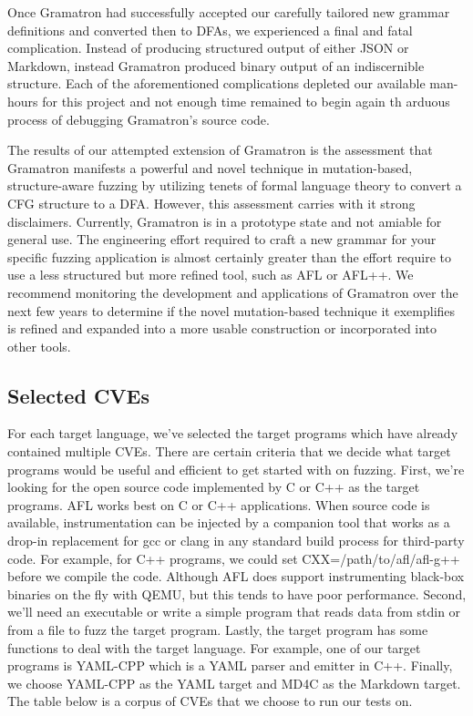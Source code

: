 \documentclass[12pt]{diazessay}
\begin{document}
Once Gramatron had successfully accepted our carefully tailored new grammar definitions and converted then to DFAs, we experienced a final and fatal complication.
Instead of producing structured output of either JSON or Markdown, instead Gramatron produced binary output of an indiscernible structure.
Each of the aforementioned complications depleted our available man-hours for this project and not enough time remained to begin again th arduous process of debugging Gramatron's source code.

The results of our attempted extension of Gramatron is the assessment that Gramatron manifests a powerful and novel technique in mutation-based, structure-aware fuzzing by utilizing tenets of formal language theory to convert a CFG structure to a DFA.
However, this assessment carries with it strong disclaimers.
Currently, Gramatron is in a prototype state and not amiable for general use. 
The engineering effort required to craft a new grammar for your specific fuzzing application is almost certainly greater than the effort require to use a less structured but more refined tool, such as AFL or AFL++.
We recommend monitoring the development and applications of Gramatron over the next few years to determine if the novel mutation-based technique it exemplifies is refined and expanded into a more usable construction or incorporated into other tools.

\subsection*{Selected CVEs}


For each target language, we’ve selected the target programs which have already contained multiple CVEs. There are certain criteria that we decide what target programs would be useful and efficient to get started with on fuzzing.  First, we’re looking for the open source code implemented by C or C++ as the target programs.  AFL works best on C or C++ applications. When source code is available, instrumentation can be injected by a companion tool that works as a drop-in replacement for gcc or clang in any standard build process for third-party code. For example, for C++ programs, we could set CXX=/path/to/afl/afl-g++ before we compile the code. Although AFL does support instrumenting black-box binaries on the fly with QEMU, but this tends to have poor performance. Second, we’ll need an executable or write a simple program that reads data from stdin or from a file to fuzz the target program. Lastly, the target program has some functions to deal with the target language. For example, one of our target programs is YAML-CPP which is a YAML parser and emitter in C++. Finally, we choose YAML-CPP as the YAML target and MD4C as the Markdown target.
The table below is a corpus of CVEs that we choose to run our tests on.
\end{document}
